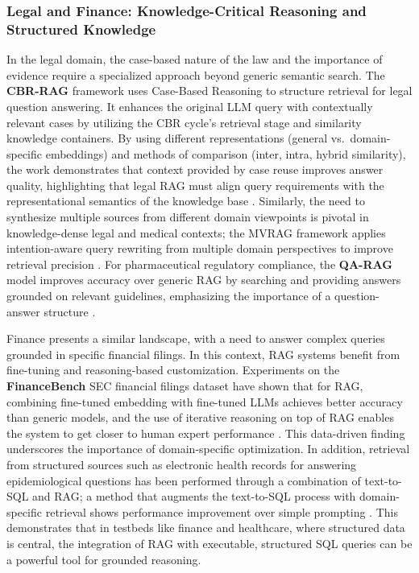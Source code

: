 \documentclass[11pt]{article}
\begin{document}
\subsubsection{Legal and Finance: Knowledge-Critical Reasoning and Structured Knowledge}

In the legal domain, the case-based nature of the law and the importance of evidence require a specialized approach beyond generic semantic search. The \textbf{CBR-RAG} framework uses Case-Based Reasoning to structure retrieval for legal question answering. It enhances the original LLM query with contextually relevant cases by utilizing the CBR cycle's retrieval stage and similarity knowledge containers. By using different representations (general vs.~domain-specific embeddings) and methods of comparison (inter, intra, hybrid similarity), the work demonstrates that context provided by case reuse improves answer quality, highlighting that legal RAG must align query requirements with the representational semantics of the knowledge base \cite{ref388}. Similarly, the need to synthesize multiple sources from different domain viewpoints is pivotal in knowledge-dense legal and medical contexts; the MVRAG framework applies intention-aware query rewriting from multiple domain perspectives to improve retrieval precision \cite{ref358}. For pharmaceutical regulatory compliance, the \textbf{QA-RAG} model improves accuracy over generic RAG by searching and providing answers grounded on relevant guidelines, emphasizing the importance of a question-answer structure \cite{ref389}.

Finance presents a similar landscape, with a need to answer complex queries grounded in specific financial filings. In this context, RAG systems benefit from fine-tuning and reasoning-based customization. Experiments on the \textbf{FinanceBench} SEC financial filings dataset have shown that for RAG, combining fine-tuned embedding with fine-tuned LLMs achieves better accuracy than generic models, and the use of iterative reasoning on top of RAG enables the system to get closer to human expert performance \cite{ref71}. This data-driven finding underscores the importance of domain-specific optimization. In addition, retrieval from structured sources such as electronic health records for answering epidemiological questions has been performed through a combination of text-to-SQL and RAG; a method that augments the text-to-SQL process with domain-specific retrieval shows performance improvement over simple prompting \cite{ref390}. This demonstrates that in testbeds like finance and healthcare, where structured data is central, the integration of RAG with executable, structured SQL queries can be a powerful tool for grounded reasoning.
\end{document}
